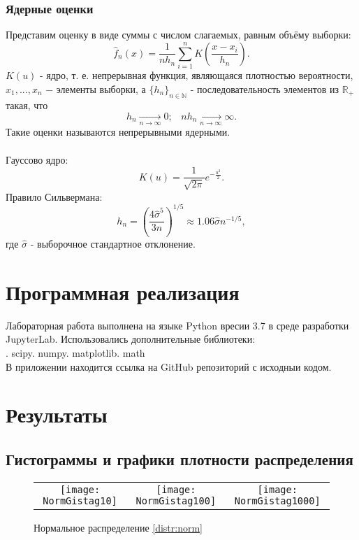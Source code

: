 \documentclass[a4paper]{article}
\begin{document}
\subsubsection{Ядерные оценки}
\noindent Представим оценку в виде суммы с числом слагаемых, равным объёму выборки:
\begin{equation} \label{KDE}
	\widehat{f}_n(x)=\frac{1}{n h_n}\sum_{i=1}^n K\left(\frac{x-x_i}{h_n}\right).
\end{equation}
$K(u)$ - ядро, т. е. непрерывная функция, являющаяся плотностью вероятности, $x_1,...,x_n$ $-$ элементы выборки, а $\{h_n\}_{n\in\mathbb{N}}$ - последовательность элементов из $\mathbb{R}_+$ такая, что
\begin{equation} \label{KDE:Prop}
	h_n\xrightarrow[n\to\infty]{}0;\;\;\;n h_n\xrightarrow[n\to\infty]{}\infty.
\end{equation}
Такие оценки называются непрерывными ядерными.\\\\
Гауссово ядро:
\begin{equation} \label{KDE:Gauss}
	K(u)=\frac{1}{\sqrt{2\pi}}e^{-\frac{u^2}{2}}.
\end{equation}
Правило Сильвермана:
\begin{equation} \label{KDE:Silverman}
	h_n=\left(\frac{4\hat{\sigma}^5}{3n}\right)^{1/5}\approx1.06\hat{\sigma}n^{-1/5},
\end{equation}
где $\hat{\sigma}$ - выборочное стандартное отклонение.


\section {Программная реализация} 	
\noindent Лабораторная работа выполнена на языке Python вресии 3.7 в среде разработки JupyterLab. Использовались дополнительные библиотеки:\\ . scipy. numpy. matplotlib. math\newline \\
В приложении находится ссылка на GitHub репозиторий с исходныи кодом.

\section {Результаты} 

\subsection{Гистограммы и графики плотности распределения}
	\begin{figure}[H]
		\centering
		\begin{tabular}{ccc}
			\texttt{[image: NormGistag10]}
			&
			\texttt{[image: NormGistag100]}
			&
			\texttt{[image: NormGistag1000]}
		\end{tabular}
		\caption{Нормальное распределение \eqref{distr:norm}} 
		\label{fig:norm}
	\end{figure}
\end{document}
